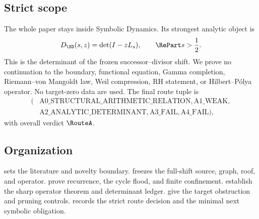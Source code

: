 \subsection{Strict scope}

The whole paper stays inside Symbolic Dynamics.  Its strongest analytic
object is
\[
 D_{\SD}(s,z)=\det(I-zL_s),\qquad \RePart s>\frac12.
\]
This is the determinant of the frozen successor--divisor shift.  We prove no
continuation to the boundary, functional equation, Gamma completion,
Riemann--von Mangoldt law, Weil compression, RH statement, or
Hilbert--Pólya operator.  No target-zero data are used.  The final route tuple
is
\[
\begin{aligned}
(&\mathrm{A0\_STRUCTURAL\_ARITHMETIC\_RELATION},
  \mathrm{A1\_WEAK},\\
 &\mathrm{A2\_ANALYTIC\_DETERMINANT},
  \mathrm{A3\_FAIL},
  \mathrm{A4\_FAIL}),
\end{aligned}
\]
with overall verdict \(\RouteA\).

\subsection{Organization}

 sets the literature and novelty boundary.
 freezes the full-shift source, graph, roof, and operator.
 prove recurrence, the cycle flood, and
finite confinement.   establish the sharp
operator theorem and determinant ledger.
 give the target obstruction and pruning
controls.   records the strict route decision and the minimal
next symbolic obligation.
